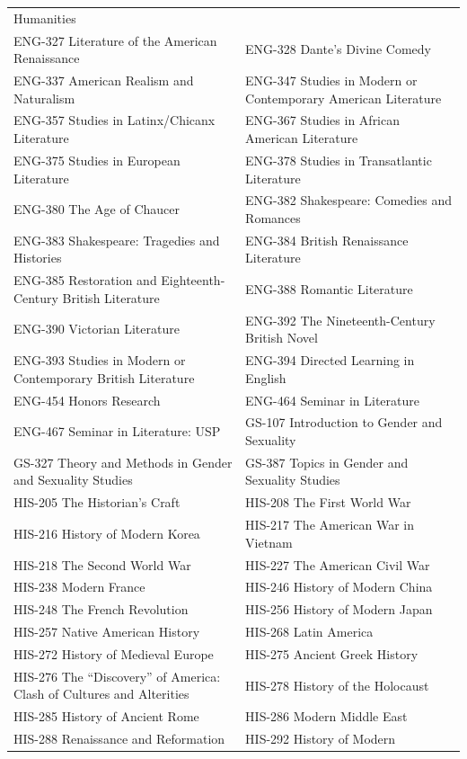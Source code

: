 \documentclass[
  letterpaper,
]{scrbook}
\begin{document}
{\begin{longtable}[]{@{}
  >{\raggedright\arraybackslash}p{}
  >{\raggedright\arraybackslash}p{}@{}}
Humanities \\
ENG-327 Literature of the American Renaissance & ENG-328 Dante's Divine
Comedy \\
ENG-337 American Realism and Naturalism & ENG-347 Studies in Modern or
Contemporary American Literature \\
ENG-357 Studies in Latinx/Chicanx Literature & ENG-367 Studies in
African American Literature \\
ENG-375 Studies in European Literature & ENG-378 Studies in
Transatlantic Literature \\
ENG-380 The Age of Chaucer & ENG-382 Shakespeare: Comedies and
Romances \\
ENG-383 Shakespeare: Tragedies and Histories & ENG-384 British
Renaissance Literature \\
ENG-385 Restoration and Eighteenth-Century British Literature & ENG-388
Romantic Literature \\
ENG-390 Victorian Literature & ENG-392 The Nineteenth-Century British
Novel \\
ENG-393 Studies in Modern or Contemporary British Literature & ENG-394
Directed Learning in English \\
ENG-454 Honors Research & ENG-464 Seminar in Literature \\
ENG-467 Seminar in Literature: USP & GS-107 Introduction to Gender and
Sexuality \\
GS-327 Theory and Methods in Gender and Sexuality Studies & GS-387
Topics in Gender and Sexuality Studies \\
HIS-205 The Historian's Craft & HIS-208 The First World War \\
HIS-216 History of Modern Korea & HIS-217 The American War in Vietnam \\
HIS-218 The Second World War & HIS-227 The American Civil War \\
HIS-238 Modern France & HIS-246 History of Modern China \\
HIS-248 The French Revolution & HIS-256 History of Modern Japan \\
HIS-257 Native American History & HIS-268 Latin America \\
HIS-272 History of Medieval Europe & HIS-275 Ancient Greek History \\
HIS-276 The ``Discovery'' of America: Clash of Cultures and Alterities &
HIS-278 History of the Holocaust \\
HIS-285 History of Ancient Rome & HIS-286 Modern Middle East \\
HIS-288 Renaissance and Reformation & HIS-292 History of Modern

\end{longtable}}
\end{document}
